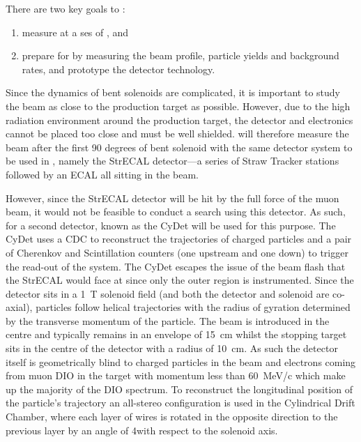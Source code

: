There are two key goals to \phaseI:
\begin{enumerate}
	\item measure \mueconv at a \acf{ses} of \sensePI, and
\item prepare for \phaseII by measuring the beam profile, particle yields and background rates, and prototype the detector technology.
\end{enumerate}
Since the dynamics of bent solenoids are complicated, it is important to study the beam as close to the production target as possible.
However, due to the high radiation environment around the production target, the detector and electronics cannot be placed too close and must be well shielded.
\phaseI will therefore measure the beam after the first 90 degrees of bent solenoid with the same detector system to be used in \phaseII, namely the \ac{StrECAL} detector---a series of Straw Tracker stations  followed by an ECAL
all sitting in the beam.  

However, since the StrECAL detector will be hit by the full force of the muon beam, it would not be feasible to conduct a \mueconv search using this detector.
As such, for \phaseI a second detector, known as the \ac{CyDet} will be used for this purpose.
The \ac{CyDet} uses a \ac{CDC} to reconstruct the trajectories of charged particles and a pair of Cherenkov and Scintillation counters (one upstream and one down) to trigger the read-out of the system.
The \ac{CyDet} escapes the issue of the beam flash that the \ac{StrECAL} would face at \phaseI since only the outer region is instrumented.
Since the detector sits in a 1~T solenoid field (and both the detector and solenoid are co-axial), particles follow helical trajectories with the radius of gyration determined by the transverse momentum of the particle.
The beam is introduced in the centre and typically remains in an envelope of 15~cm whilst the stopping target sits in the centre of the detector with a radius of 10~cm.
As such the detector itself is geometrically blind to charged particles in the beam and electrons coming from muon \ac{DIO} in the target with momentum less than 60~MeV/c which make up the majority of the \ac{DIO} spectrum.
To reconstruct the longitudinal position of the particle's trajectory an all-stereo configuration is used in the Cylindrical Drift Chamber, where each layer of wires is rotated in the opposite direction to the previous layer by an angle of 4\degree with respect to the solenoid axis.

